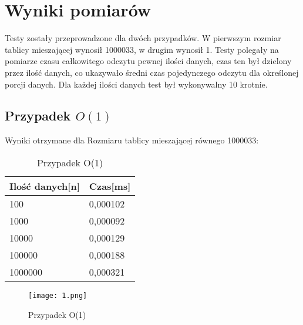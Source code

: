 \documentclass[12pt,a4paper,titlepage]{article}
\begin{document}
\section{Wyniki pomiarów}
Testy zostały przeprowadzone dla dwóch przypadków.
W pierwszym rozmiar tablicy mieszającej wynosił 1000033, w drugim wynosił 1.\newline
Testy polegały na pomiarze czasu całkowitego odczytu pewnej ilości danych, czas ten był dzielony przez ilość danych, co ukazywało średni czas pojedynczego odczytu dla określonej porcji danych.\newline
Dla każdej ilości danych test był wykonywalny 10 krotnie.
\subsection{Przypadek $O(1)$}
Wyniki otrzymane dla Rozmiaru tablicy mieszającej równego 1000033:
\begin{table}[h]
\begin{center}
\begin{tabular}{|l|l|}
\hline
Ilość danych[n] &Czas[ms]   \\ \hline
100 & 0,000102 \\ \hline
1000 & 0,000092 \\ \hline
10000 &0,000129 \\ \hline
100000 & 0,000188 \\ \hline
1000000 & 0,000321 \\ \hline
\end{tabular}
\caption{Przypadek O(1)}
\end{center}
\end{table}
\begin{figure}[!htbp]
\texttt{[image: 1.png]}
\caption{Przypadek O(1)}
\end{figure}
\end{document}
